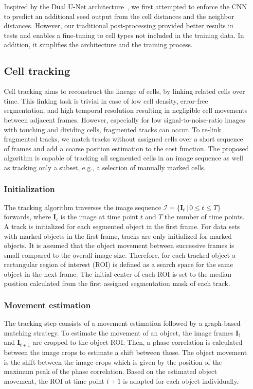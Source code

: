 \documentclass[10pt,letterpaper]{article}
\begin{document}
Inspired by the Dual U-Net architecture~\cite{Li2019}, we first attempted to enforce the CNN to predict an additional seed output from the cell distances and the neighbor distances. However, our traditional post-processing provided better results in tests and enables a fine-tuning to cell types not included in the training data. In addition, it simplifies the architecture and the training process.

\subsection*{Cell tracking}
Cell tracking aims to reconstruct the lineage of cells, by linking related cells over time. This linking task is trivial in case of low cell density, error-free segmentation, and high temporal resolution resulting in negligible cell movements between adjacent frames. However, especially for low signal-to-noise-ratio images with touching and dividing cells, fragmented tracks can occur. To re-link fragmented tracks, we match tracks without assigned cells over a short sequence of frames and add a coarse position estimation to the cost function. The proposed algorithm is capable of tracking all segmented cells in an image sequence as well as tracking only a subset, e.g., a selection of manually marked cells.

\subsubsection*{Initialization} 
The tracking algorithm traverses the image sequence $\mathcal{I}=\{\mathbf{I}_t\, |\, 0 \le t \le T\}$ forwards, where $\mathbf{I}_t$ is the image at time point $t$ and $T$ the number of time points. A track is initialized for each segmented object in the first frame. For data sets with marked objects in the first frame, tracks are only initialized for marked objects. It is assumed that the object movement between successive frames is small compared to the overall image size. Therefore, for each tracked object a rectangular region of interest (ROI) is defined as a search space for the same object in the next frame. The initial center of each ROI is set to the median position calculated from the first assigned segmentation mask of each track.

\subsubsection*{Movement estimation} The tracking step consists of a movement estimation followed by a graph-based matching strategy. To estimate the movement of an object, the image frames $\mathbf{I}_t$ and $\mathbf{I}_{t+1}$  are cropped to the object ROI. Then, a phase correlation \cite{Kuglin1975} is calculated between the image crops to estimate a shift between those. The object movement is the shift between the image crops which is given by the position of the maximum peak of the phase correlation. Based on the estimated object movement, the ROI at time point  $t+1$ is adapted for each object individually.
\end{document}

